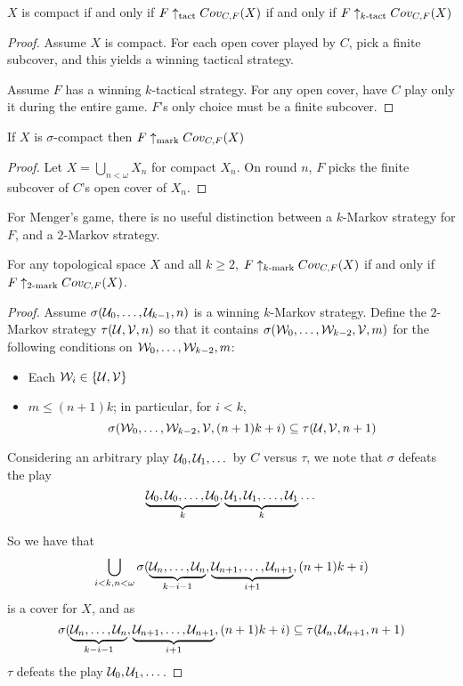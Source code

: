   \begin{proposition}
    $X$ is compact if and only if $F \uparrow_{\text{tact}} Cov_{C,F}(X)$ if and only if $F \uparrow_{k\text{-tact}} Cov_{C,F}(X)$
  \end{proposition}

  \begin{proof}
    Assume $X$ is compact. For each open cover played by $C$, pick a finite subcover, and this yields a winning tactical strategy.

    Assume $F$ has a winning $k$-tactical strategy. For any open cover, have $C$ play only it during the entire game. $F$'s only choice must be a finite subcover.
  \end{proof}

  \begin{proposition}
    If $X$ is $\sigma$-compact then $F \uparrow_{\text{mark}} Cov_{C,F}(X)$
  \end{proposition}

  \begin{proof}
    Let $X=\bigcup_{n<\omega} X_n$ for compact $X_n$. On round $n$, $F$ picks the finite subcover of $C$'s open cover of $X_n$.
  \end{proof}

  For Menger's game, there is no useful distinction between a $k$-Markov strategy for $F$, and a $2$-Markov strategy.

  \begin{theorem}
  For any topological space $X$ and all $k \geq 2$, $F \uparrow_{k\text{-mark}} Cov_{C,F}(X)$ if and only if $F \uparrow_{2\text{-mark}} Cov_{C,F}(X)$.
  \end{theorem}

  \begin{proof}
  Assume $\sigma(\mathcal{U}_0,\dots,\mathcal{U}_{k-1},n)$ is a winning $k$-Markov strategy. Define the $2$-Markov strategy $\tau(\mathcal{U},\mathcal{V},n)$ so that it contains $\sigma(\mathcal{W}_0,\dots,\mathcal{W}_{k-2},\mathcal{V},m)$ for the following conditions on $\mathcal{W}_0,\dots,\mathcal{W}_{k-2},m$:
    \begin{itemize}
    \item Each $\mathcal{W}_i \in \{\mathcal{U},\mathcal{V}\}$
    \item $m \leq (n+1)k$; in particular, for $i<k$, 
      \[
        \sigma(\mathcal{W}_0,\dots,\mathcal{W}_{k-2},\mathcal{V},(n+1)k+i)
        \subseteq 
        \tau(\mathcal{U},\mathcal{V},n+1) 
      \]
    \end{itemize}

  Considering an arbitrary play $\mathcal{U}_0, \mathcal{U}_1, \dots$ by $C$ versus $\tau$, we note that $\sigma$ defeats the play 
  \[
    \underbrace{\mathcal{U}_0,\mathcal{U}_0,\dots,\mathcal{U}_0}_{k},
    \underbrace{\mathcal{U}_1,\mathcal{U}_1,\dots,\mathcal{U}_1}_{k}
    \dots
  \]

  So we have that
    \[
      \bigcup_{i<k, n<\omega} \sigma(
      \underbrace{\mathcal{U}_n,\dots,\mathcal{U}_n}_{k-i-1},
      \underbrace{\mathcal{U}_{n+1},\dots,\mathcal{U}_{n+1}}_{i+1},
      (n+1)k+i)
    \]
  is a cover for $X$, and as 
    \[
      \sigma(
      \underbrace{\mathcal{U}_n,\dots,\mathcal{U}_n}_{k-i-1},
      \underbrace{\mathcal{U}_{n+1},\dots,\mathcal{U}_{n+1}}_{i+1},
      (n+1)k+i)
      \subseteq 
      \tau(\mathcal{U}_n,\mathcal{U}_{n+1},n+1)
    \]
  $\tau$ defeats the play $\mathcal{U}_0, \mathcal{U}_1, \dots$.
  \end{proof}

